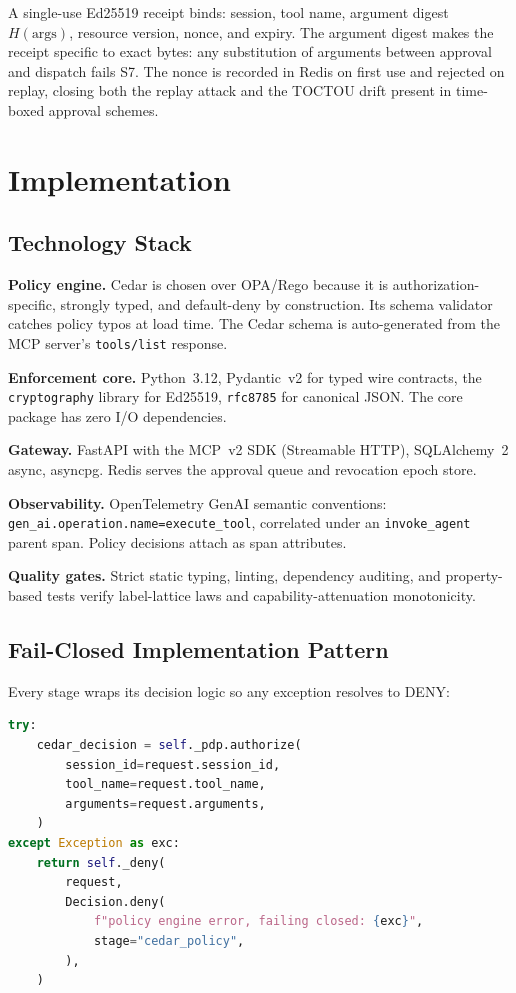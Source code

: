 \documentclass[10pt,conference]{IEEEtran}
\begin{document}
A single-use Ed25519 receipt binds: session, tool name, argument digest
$H(\text{args})$, resource version, nonce, and expiry. The argument digest
makes the receipt specific to exact bytes: any substitution of arguments
between approval and dispatch fails S7. The nonce is recorded in Redis on
first use and rejected on replay, closing both the replay attack and the
TOCTOU drift present in time-boxed approval schemes.

\section{Implementation}

\subsection{Technology Stack}

\textbf{Policy engine.} Cedar \cite{cedar2023} is chosen over OPA/Rego
because it is authorization-specific, strongly typed, and default-deny by
construction. Its schema validator catches policy typos at load time. The Cedar
schema is auto-generated from the MCP server's \texttt{tools/list} response.

\textbf{Enforcement core.} Python~3.12, Pydantic~v2 for typed wire contracts,
the \texttt{cryptography} library for Ed25519, \texttt{rfc8785} for canonical
JSON. The core package has zero I/O dependencies.

\textbf{Gateway.} FastAPI with the MCP~v2 SDK (Streamable HTTP),
SQLAlchemy~2 async, asyncpg. Redis serves the approval queue and revocation
epoch store.

\textbf{Observability.} OpenTelemetry GenAI semantic conventions:
\texttt{gen\_ai.operation.name=execute\_tool}, correlated under an
\texttt{invoke\_agent} parent span. Policy decisions attach as span attributes.

\textbf{Quality gates.} Strict static typing, linting, dependency auditing,
and property-based tests verify label-lattice laws and
capability-attenuation monotonicity.

\subsection{Fail-Closed Implementation Pattern}

Every stage wraps its decision logic so any exception resolves to DENY:

\begin{lstlisting}[language=Python]
try:
    cedar_decision = self._pdp.authorize(
        session_id=request.session_id,
        tool_name=request.tool_name,
        arguments=request.arguments,
    )
except Exception as exc:
    return self._deny(
        request,
        Decision.deny(
            f"policy engine error, failing closed: {exc}",
            stage="cedar_policy",
        ),
    )
\end{lstlisting}
\end{document}
